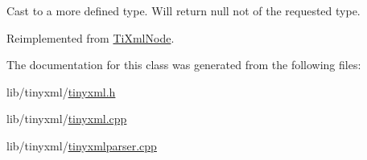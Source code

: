 Cast to a more defined type. Will return null not of the requested type. 



Reimplemented from \hyperlink{class_ti_xml_node_a6a4c8ac28ee7a745d059db6691e03bae}{Ti\-Xml\-Node}.



The documentation for this class was generated from the following files\-:\begin{DoxyCompactItemize}
\item 
lib/tinyxml/\hyperlink{tinyxml_8h}{tinyxml.\-h}\item 
lib/tinyxml/\hyperlink{tinyxml_8cpp}{tinyxml.\-cpp}\item 
lib/tinyxml/\hyperlink{tinyxmlparser_8cpp}{tinyxmlparser.\-cpp}\end{DoxyCompactItemize}

